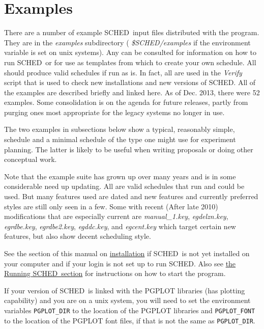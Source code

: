 \documentclass{report}
\newcommand{\sched}{{\sc SCHED}}
\newcommand{\schedb}{{\sc SCHED~}}
\begin{document}
\section{\label{SEC:EXAMPLES}Examples}

There are a number of example \schedb input files distributed with the
program.  They are in the {\sl examples} subdirectory ({\sl
\$SCHED/examples} if the environment variable is set on unix systems).
Any can be consulted for information on how to run \schedb or for use
as templates from which to create your own schedule.  All should
produce valid schedules if run as is.  In fact, all are used in the
{\sl Verify} script that is used to check new installations and new
versions of \sched.  All of the examples are described briefly and
linked here.  As of Dec. 2013, there were 52 examples.  Some
consolidation is on the agenda for future releases, partly from purging
ones most appropriate for the legacy systems no longer in use.

The two examples in subsections below show a typical, reasonably
simple, schedule and a minimal schedule of the type one might use for
experiment planning.  The latter is likely to be useful when writing
proposals or doing other conceptual work.

Note that the example suite has grown up over many years and is in
some considerable need up updating.  All are valid schedules that run
and could be used.  But many features used are dated and new features
and currently preferred styles are still only seen in a few.  Some
with recent (After late 2010) modifications that are especially current are
{\sl manual\_1.key}, {\sl egdelzn.key}, {\sl egrdbe.key}, 
{\sl egrdbe2.key}, {\sl egddc.key}, and {\sl egcent.key} which target 
certain new features, but also show decent scheduling style.

See the section of this manual on
\hyperref[SEC:INSTALL]{installation}
if \schedb is not yet installed on your computer and if your login
is not set up to run \sched.  Also see
\hyperref[SEC:RUNSCHED]{the Running \schedb section}
for instructions on how to start the program.

If your version of \schedb is linked with the {\sc PGPLOT} libraries
(has plotting capability) and you are on a unix system, you will need
to set the environment variables {\tt PGPLOT\_DIR} to the location of
the {\sc PGPLOT} libraries and {\tt PGPLOT\_FONT} to the location of
the {\sc PGPLOT} font files, if that is not the same as {\tt PGPLOT\_DIR}.
\end{document}
